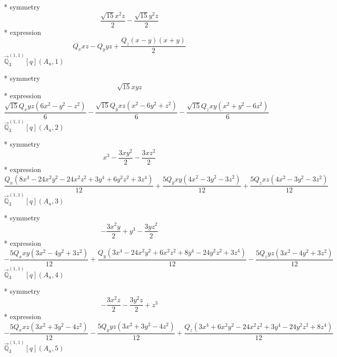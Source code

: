 \documentclass[fleqn,8pt]{jsarticle}
\begin{document}
\noindent\quad ** symmetry
\begin{dmath*}
\frac{\sqrt{15} x^{2} z}{2} - \frac{\sqrt{15} y^{2} z}{2}
\end{dmath*}
\noindent\quad ** expression
\begin{dmath*}
Q_{x} x z - Q_{y} y z + \frac{Q_{z} \left(x - y\right) \left(x + y\right)}{2}
\end{dmath*}
\noindent\quad $\vec{\mathbb{Q}}_{3}^{(1,1)}[q](A_{u},1)$

\noindent\quad ** symmetry
\begin{dmath*}
\sqrt{15} x y z
\end{dmath*}
\noindent\quad ** expression
\begin{dmath*}
\frac{\sqrt{15} Q_{x} y z \left(6 x^{2} - y^{2} - z^{2}\right)}{6} - \frac{\sqrt{15} Q_{y} x z \left(x^{2} - 6 y^{2} + z^{2}\right)}{6} - \frac{\sqrt{15} Q_{z} x y \left(x^{2} + y^{2} - 6 z^{2}\right)}{6}
\end{dmath*}
\noindent\quad $\vec{\mathbb{Q}}_{3}^{(1,1)}[q](A_{u},2)$

\noindent\quad ** symmetry
\begin{dmath*}
x^{3} - \frac{3 x y^{2}}{2} - \frac{3 x z^{2}}{2}
\end{dmath*}
\noindent\quad ** expression
\begin{dmath*}
\frac{Q_{x} \left(8 x^{4} - 24 x^{2} y^{2} - 24 x^{2} z^{2} + 3 y^{4} + 6 y^{2} z^{2} + 3 z^{4}\right)}{12} + \frac{5 Q_{y} x y \left(4 x^{2} - 3 y^{2} - 3 z^{2}\right)}{12} + \frac{5 Q_{z} x z \left(4 x^{2} - 3 y^{2} - 3 z^{2}\right)}{12}
\end{dmath*}
\noindent\quad $\vec{\mathbb{Q}}_{3}^{(1,1)}[q](A_{u},3)$

\noindent\quad ** symmetry
\begin{dmath*}
- \frac{3 x^{2} y}{2} + y^{3} - \frac{3 y z^{2}}{2}
\end{dmath*}
\noindent\quad ** expression
\begin{dmath*}
- \frac{5 Q_{x} x y \left(3 x^{2} - 4 y^{2} + 3 z^{2}\right)}{12} + \frac{Q_{y} \left(3 x^{4} - 24 x^{2} y^{2} + 6 x^{2} z^{2} + 8 y^{4} - 24 y^{2} z^{2} + 3 z^{4}\right)}{12} - \frac{5 Q_{z} y z \left(3 x^{2} - 4 y^{2} + 3 z^{2}\right)}{12}
\end{dmath*}
\noindent\quad $\vec{\mathbb{Q}}_{3}^{(1,1)}[q](A_{u},4)$

\noindent\quad ** symmetry
\begin{dmath*}
- \frac{3 x^{2} z}{2} - \frac{3 y^{2} z}{2} + z^{3}
\end{dmath*}
\noindent\quad ** expression
\begin{dmath*}
- \frac{5 Q_{x} x z \left(3 x^{2} + 3 y^{2} - 4 z^{2}\right)}{12} - \frac{5 Q_{y} y z \left(3 x^{2} + 3 y^{2} - 4 z^{2}\right)}{12} + \frac{Q_{z} \left(3 x^{4} + 6 x^{2} y^{2} - 24 x^{2} z^{2} + 3 y^{4} - 24 y^{2} z^{2} + 8 z^{4}\right)}{12}
\end{dmath*}
\noindent\quad $\vec{\mathbb{Q}}_{3}^{(1,1)}[q](A_{u},5)$
\end{document}

